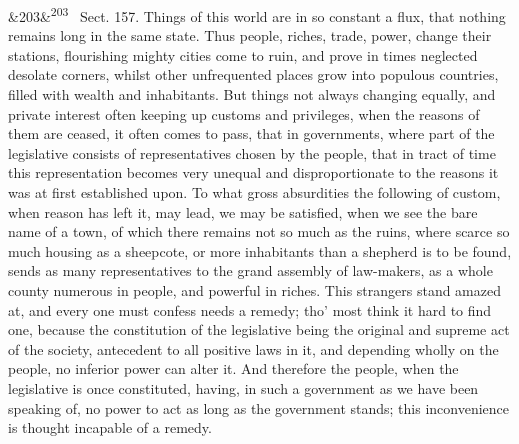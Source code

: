 \documentclass[12pt]{article}
\newcommand{\para}[1][]{\par\noindent\ifx&#1&\else\textsuperscript{\footnotesize #1}~\fi}
\begin{document}
\para[203] Sect. 157. Things of this world are in so constant a flux, that nothing remains long in the same state. Thus people, riches, trade, power, change their stations, flourishing mighty cities come to ruin, and prove in times neglected desolate corners, whilst other unfrequented places grow into populous countries, filled with wealth and inhabitants. But things not always changing equally, and private interest often keeping up customs and privileges, when the reasons of them are ceased, it often comes to pass, that in governments, where part of the legislative consists of representatives chosen by the people, that in tract of time this representation becomes very unequal and disproportionate to the reasons it was at first established upon. To what gross absurdities the following of custom, when reason has left it, may lead, we may be satisfied, when we see the bare name of a town, of which there remains not so much as the ruins, where scarce so much housing as a sheepcote, or more inhabitants than a shepherd is to be found, sends as many representatives to the grand assembly of law-makers, as a whole county numerous in people, and powerful in riches. This strangers stand amazed at, and every one must confess needs a remedy; tho' most think it hard to find one, because the constitution of the legislative being the original and supreme act of the society, antecedent to all positive laws in it, and depending wholly on the people, no inferior power can alter it. And therefore the people, when the legislative is once constituted, having, in such a government as we have been speaking of, no power to act as long as the government stands; this inconvenience is thought incapable of a remedy.
\end{document}
